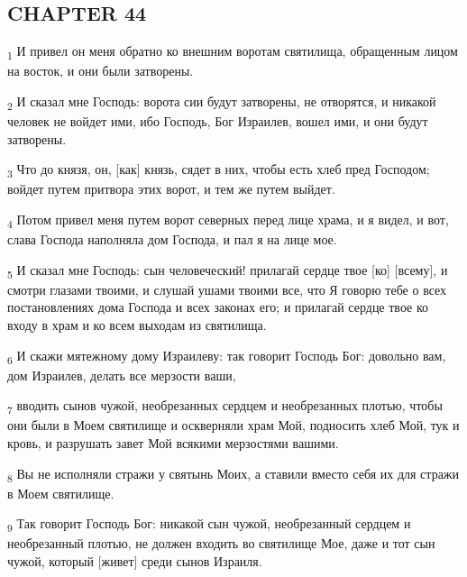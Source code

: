 \subsection{CHAPTER 44}
\begin{tcolorbox}
\textsubscript{1} И привел он меня обратно ко внешним воротам святилища, обращенным лицом на восток, и они были затворены.
\end{tcolorbox}
\begin{tcolorbox}
\textsubscript{2} И сказал мне Господь: ворота сии будут затворены, не отворятся, и никакой человек не войдет ими, ибо Господь, Бог Израилев, вошел ими, и они будут затворены.
\end{tcolorbox}
\begin{tcolorbox}
\textsubscript{3} Что до князя, он, [как] князь, сядет в них, чтобы есть хлеб пред Господом; войдет путем притвора этих ворот, и тем же путем выйдет.
\end{tcolorbox}
\begin{tcolorbox}
\textsubscript{4} Потом привел меня путем ворот северных перед лице храма, и я видел, и вот, слава Господа наполняла дом Господа, и пал я на лице мое.
\end{tcolorbox}
\begin{tcolorbox}
\textsubscript{5} И сказал мне Господь: сын человеческий! прилагай сердце твое [ко] [всему], и смотри глазами твоими, и слушай ушами твоими все, что Я говорю тебе о всех постановлениях дома Господа и всех законах его; и прилагай сердце твое ко входу в храм и ко всем выходам из святилища.
\end{tcolorbox}
\begin{tcolorbox}
\textsubscript{6} И скажи мятежному дому Израилеву: так говорит Господь Бог: довольно вам, дом Израилев, делать все мерзости ваши,
\end{tcolorbox}
\begin{tcolorbox}
\textsubscript{7} вводить сынов чужой, необрезанных сердцем и необрезанных плотью, чтобы они были в Моем святилище и оскверняли храм Мой, подносить хлеб Мой, тук и кровь, и разрушать завет Мой всякими мерзостями вашими.
\end{tcolorbox}
\begin{tcolorbox}
\textsubscript{8} Вы не исполняли стражи у святынь Моих, а ставили вместо себя их для стражи в Моем святилище.
\end{tcolorbox}
\begin{tcolorbox}
\textsubscript{9} Так говорит Господь Бог: никакой сын чужой, необрезанный сердцем и необрезанный плотью, не должен входить во святилище Мое, даже и тот сын чужой, который [живет] среди сынов Израиля.
\end{tcolorbox}
